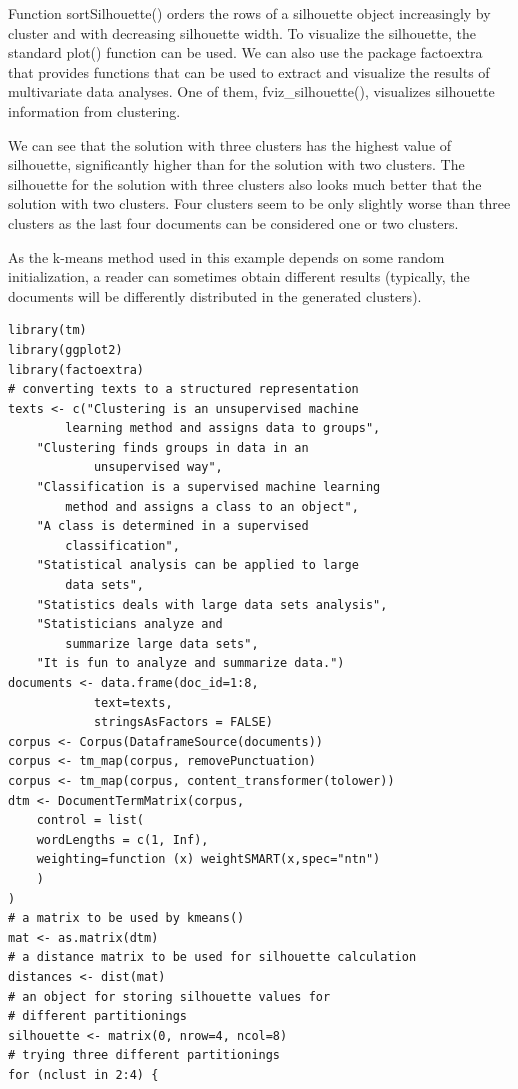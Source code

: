 \documentclass[10pt]{book}
\begin{document}
Function sortSilhouette() orders the rows of a silhouette object increasingly by cluster and with decreasing silhouette width. To visualize the silhouette, the standard plot() function can be used. We can also use the package factoextra that provides functions that can be used to extract and visualize the results of multivariate data analyses. One of them, fviz\_silhouette(), visualizes silhouette information from clustering.

We can see that the solution with three clusters has the highest value of silhouette, significantly higher than for the solution with two clusters. The silhouette for the solution with three clusters also looks much better that the solution with two clusters. Four clusters seem to be only slightly worse than three clusters as the last four documents can be considered one or two clusters.

As the k-means method used in this example depends on some random initialization, a reader can sometimes obtain different results (typically, the documents will be differently distributed in the generated clusters).

\begin{verbatim}
library(tm)
library(ggplot2)
library(factoextra)
# converting texts to a structured representation
texts <- c("Clustering is an unsupervised machine
        learning method and assigns data to groups",
    "Clustering finds groups in data in an
            unsupervised way",
    "Classification is a supervised machine learning
        method and assigns a class to an object",
    "A class is determined in a supervised
        classification",
    "Statistical analysis can be applied to large
        data sets",
    "Statistics deals with large data sets analysis",
    "Statisticians analyze and
        summarize large data sets",
    "It is fun to analyze and summarize data.")
documents <- data.frame(doc_id=1:8,
            text=texts,
            stringsAsFactors = FALSE)
corpus <- Corpus(DataframeSource(documents))
corpus <- tm_map(corpus, removePunctuation)
corpus <- tm_map(corpus, content_transformer(tolower))
dtm <- DocumentTermMatrix(corpus,
    control = list(
    wordLengths = c(1, Inf),
    weighting=function (x) weightSMART(x,spec="ntn")
    )
)
# a matrix to be used by kmeans()
mat <- as.matrix(dtm)
# a distance matrix to be used for silhouette calculation
distances <- dist(mat)
# an object for storing silhouette values for
# different partitionings
silhouette <- matrix(0, nrow=4, ncol=8)
# trying three different partitionings
for (nclust in 2:4) {
\end{verbatim}
\end{document}
